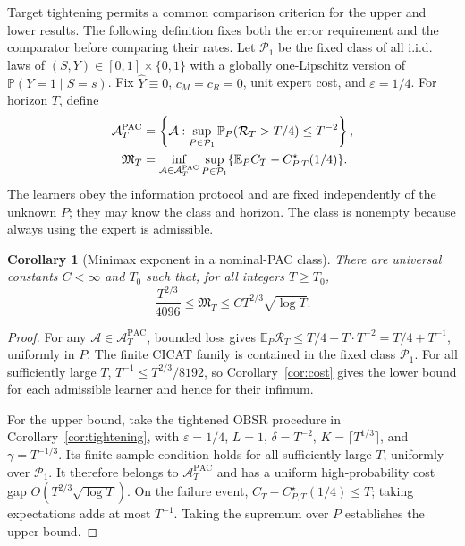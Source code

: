 \documentclass[11pt]{article}
\newtheorem{corollary}[theorem]{Corollary}
\theoremstyle{remark}
\newcommand{\E}{\mathbb E}
\newcommand{\Pp}{\mathbb P}
\newcommand{\calR}{\mathcal R}
\newcommand{\eps}{\varepsilon}
\begin{document}
Target tightening permits a common comparison criterion for the upper and
lower results. The following definition fixes both the error requirement
and the comparator before comparing their rates.
Let $\mathcal P_1$ be the fixed class of all i.i.d. laws of
$(S,Y)\in[0,1]\times\{0,1\}$ with a globally one-Lipschitz version
of $\Pp(Y=1\mid S=s)$. Fix $\widehat Y\equiv0$, $c_M=c_R=0$,
unit expert cost, and $\eps=1/4$. For horizon $T$, define
\begin{align}
 \mathcal A_T^{\mathrm{PAC}}
 &=\left\{\mathcal A:
    \sup_{P\in\mathcal P_1}\Pp_P(\calR_T>T/4)\le T^{-2}\right\},
 \notag\\
 \mathfrak M_T
 &=\inf_{\mathcal A\in\mathcal A_T^{\mathrm{PAC}}}
   \sup_{P\in\mathcal P_1}
      \{\E_P C_T-C_{P,T}^\star(1/4)\}.
 \label{eq:minimax-definition}
\end{align}
The learners obey the information protocol and are fixed independently of
the unknown $P$; they may know the class and horizon. The class is
nonempty because always using the expert is admissible.

\begin{corollary}[Minimax exponent in a nominal-PAC class]
\label{cor:minimax}
There are universal constants $C<\infty$ and $T_0$ such that, for all
integers $T\ge T_0$,
\begin{equation}
 \frac{T^{2/3}}{4096}\le\mathfrak M_T
       \le C T^{2/3}\sqrt{\log T}.
 \label{eq:minimax}
\end{equation}
\end{corollary}
\begin{proof}
For any $\mathcal A\in\mathcal A_T^{\mathrm{PAC}}$, bounded loss gives
$\E_P\calR_T\le T/4+T\cdot T^{-2}=T/4+T^{-1}$, uniformly in $P$.
The finite CICAT family is contained in the fixed class $\mathcal P_1$.
For all sufficiently large $T$, $T^{-1}\le T^{2/3}/8192$, so
Corollary~\ref{cor:cost} gives the lower bound for each admissible
learner and hence for their infimum.

For the upper bound, take the tightened OBSR procedure in
Corollary~\ref{cor:tightening}, with $\eps=1/4$, $L=1$,
$\delta=T^{-2}$, $K=\lceil T^{1/3}\rceil$, and $\gamma=T^{-1/3}$.
Its finite-sample condition holds for all sufficiently large $T$,
uniformly over $\mathcal P_1$. It therefore belongs to
$\mathcal A_T^{\mathrm{PAC}}$ and has a uniform high-probability
cost gap $O(T^{2/3}\sqrt{\log T})$.
On the failure event, $C_T-C_{P,T}^\star(1/4)\le T$; taking
expectations adds at most $T^{-1}$. Taking the supremum over $P$
establishes the upper bound.
\end{proof}
\end{document}

